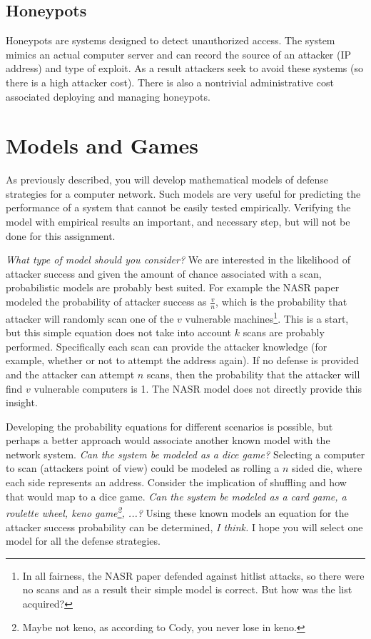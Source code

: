 \documentclass[10pt]{article}
\begin{document}
\subsection*{Honeypots}

Honeypots are systems designed to detect unauthorized access. The system mimics an actual computer server and can record the source of an attacker (IP address) and type of exploit. As a result attackers seek to avoid these systems (so there is a high attacker cost). There is also a nontrivial administrative cost associated deploying and managing honeypots.

\section*{Models and Games}

As previously described, you will develop mathematical models of defense strategies for a computer network. Such models are very useful for predicting the performance of a system that cannot be easily tested empirically. Verifying the model with empirical results an important, and necessary step, but will not be done for this assignment.

\textit{What type of model should you consider?}  We are interested in the likelihood of attacker success and given the amount of chance associated with a scan, probabilistic models are probably best suited. For example the NASR paper modeled the probability of attacker success as $\frac{v}{n}$, which is the probability that attacker will randomly scan one of the $v$ vulnerable machines\footnote{In all fairness, the NASR paper defended against hitlist attacks, so there were no scans and as a result their simple model is correct. But how was the list acquired? }. This is a start, but this simple equation does not take into account $k$ scans are probably performed. Specifically each scan can provide the attacker knowledge (for example, whether or not to attempt the address again). If no defense is provided and the attacker can attempt $n$ scans, then the probability that the attacker will find $v$ vulnerable computers is 1. The NASR model does not directly provide this insight.

Developing the probability equations for different scenarios is possible, but perhaps a better approach would associate another known model with the network system. \textit{Can the system be modeled as a dice game?} Selecting a computer to scan (attackers point of view) could be modeled as rolling a $n$ sided die, where each side represents an address. Consider the implication of shuffling and how that would map to a dice game. \textit{Can the system be modeled as a card game, a roulette wheel, keno game\footnote{Maybe not keno, as according to Cody, you never lose in keno.}, ...?}  Using these known models an equation for the attacker success probability can be determined, \textit{I think.}  I hope you will select one model for all the defense strategies.
\end{document}

